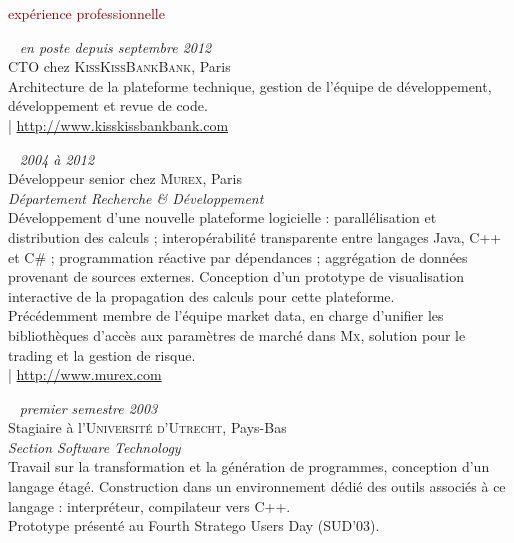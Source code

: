 \documentclass[a4paper, 10pt]{article}
\newcommand{\mysection}[1]{\fontspec{Hoefler Text}\fontsize{24pt}{0pt}\selectfont #1}%
\newcommand{\myurl}[1]{\fontspec{Gill Sans}\fontsize{10pt}{0pt}\selectfont #1}%
\begin{document}
  \begin{minipage}[t]{0.59\linewidth}
    {\textcolor{maroon}{\mysection exp\'erience professionnelle}}\\

    \par ~ \hfill \textcolor{medg}{\textit{en poste depuis septembre 2012}}\\[5pt]
    {\large CTO chez \textsc{KissKissBankBank}, Paris}\\[5pt]
    Architecture de la plateforme technique, gestion de l'équipe de développement,
    développement et revue de code.\\[5pt]
    {\textcolor{hyperlink}{\myurl | \url{http://www.kisskissbankbank.com}}}\\

    \par ~ \hfill \textcolor{medg}{\textit{2004 à 2012}}\\[5pt]
    {\large D\'eveloppeur senior chez \textsc{Murex}, Paris\\
    \emph{\textcolor{darkg}{D\'epartement Recherche \& D\'eveloppement}}}\\[5pt]
    D\'eveloppement d'une nouvelle plateforme logicielle : parall\'elisation et distribution des calculs ; interop\'erabilit\'e transparente entre langages Java, C++ et C\# ; programmation r\'eactive par d\'ependances ; aggr\'egation de donn\'ees provenant de sources externes. Conception d'un prototype de visualisation interactive de la propagation des calculs pour cette plateforme.\\[5pt]
    Pr\'ec\'edemment membre de l'\'equipe market data, en charge d'unifier les biblioth\`eques d'acc\`es aux param\`etres de march\'e dans \textsc{Mx}, solution pour le trading et la gestion de risque.\\[5pt]
    {\textcolor{hyperlink}{\myurl | \url{http://www.murex.com}}}\\

    \par ~ \hfill \textcolor{medg}{\textit{premier semestre 2003}}\\[5pt]
    {\large Stagiaire \`a l'\textsc{Universit\'e d'Utrecht}, Pays-Bas\\
    \emph{\textcolor{darkg}{Section Software Technology}}}\\[5pt]
    Travail sur la transformation et la g\'en\'eration de programmes, conception d'un langage \'etag\'e. Construction dans un environnement d\'edi\'e des outils associ\'es \`a ce langage : interpr\'eteur, compilateur vers C++.\\[5pt]
    Prototype pr\'esent\'e au Fourth Stratego Users Day (SUD'03).\\


\end{minipage}
\end{document}
